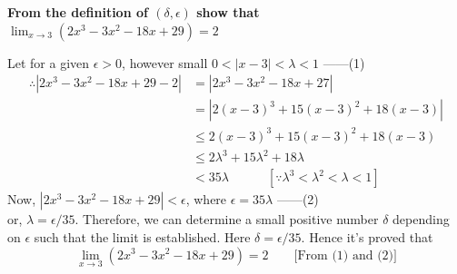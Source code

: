 \documentclass[12pt]{article}
\begin{document}
\begin{exercise}{\textbf{From the definition of $(\delta,\epsilon)$ show that $\lim_{x \to 3} (2x^3-3x^2-18x+29)=2$}}

    Let for a given $\epsilon>0$, however small $0<|x-3|<\lambda<1$ ------(1)
    \begin{align*}
        \therefore |2x^3-3x^2-18x+29 - 2| &= |2x^3-3x^2-18x+27| \\
        &= |2(x-3)^3 + 15(x-3)^2 + 18(x-3)| \\
        &\le 2(x-3)^3 + 15(x-3)^2 + 18(x-3) \\
        &\le 2\lambda^3 + 15\lambda^2 + 18\lambda \\
        &< 35\lambda \quad\quad\quad [ \because \lambda^3<\lambda^2<\lambda<1 ]
    \end{align*}
    Now, $|2x^3-3x^2-18x+29|<\epsilon$, where $\epsilon=35\lambda$ ------(2) \\
    or, $\lambda=\epsilon/35$. Therefore, we can determine a small positive number $\delta$ depending on $\epsilon$ such that the limit is established. Here $\delta=\epsilon/35$. Hence it's proved that \[
        \lim_{x \to 3} (2x^3-3x^2-18x+29) = 2 \quad\quad \text{[From (1) and (2)]}
    \]
\end{exercise}

    








    
\end{document}
